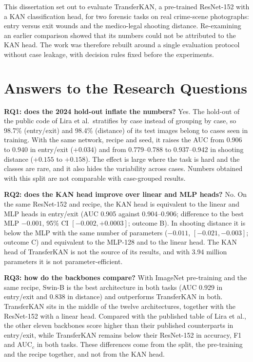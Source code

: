 \label{chap:conclusions}

This dissertation set out to evaluate TransferKAN, a pre-trained ResNet-152 with a KAN classification head, for two forensic tasks on real crime-scene photographs: entry versus exit wounds and the medico-legal shooting distance. Re-examining an earlier comparison showed that its numbers could not be attributed to the KAN head. The work was therefore rebuilt around a single evaluation protocol without case leakage, with decision rules fixed before the experiments.

\section{Answers to the Research Questions}
\label{sec:respostas}

\textbf{RQ1: does the 2024 hold-out inflate the numbers?} Yes. The hold-out of the public code of Lira et al.\ stratifies by case instead of grouping by case, so 98.7\% (entry/exit) and 98.4\% (distance) of its test images belong to cases seen in training. With the same network, recipe and seed, it raises the AUC from 0.906 to 0.940 in entry/exit ($+0.034$) and from 0.779--0.788 to 0.937--0.942 in shooting distance ($+0.155$ to $+0.158$). The effect is large where the task is hard and the classes are rare, and it also hides the variability across cases. Numbers obtained with this split are not comparable with case-grouped results.

\textbf{RQ2: does the KAN head improve over linear and MLP heads?} No. On the same ResNet-152 and recipe, the KAN head is equivalent to the linear and MLP heads in entry/exit (AUC 0.905 against 0.904--0.906; difference to the best MLP $-0.001$, 95\% CI $[-0.002, +0.0003]$; outcome B). In shooting distance it is below the MLP with the same number of parameters ($-0.011$, $[-0.021, -0.003]$; outcome C) and equivalent to the MLP-128 and to the linear head. The KAN head of TransferKAN is not the source of its results, and with 3.94 million parameters it is not parameter-efficient.

\textbf{RQ3: how do the backbones compare?} With ImageNet pre-training and the same recipe, Swin-B is the best architecture in both tasks (AUC 0.929 in entry/exit and 0.838 in distance) and outperforms TransferKAN in both. TransferKAN sits in the middle of the twelve architectures, together with the ResNet-152 with a linear head. Compared with the published table of Lira et al., the other eleven backbones score higher than their published counterparts in entry/exit, while TransferKAN remains below their ResNet-152 in accuracy, F1 and AUC$_c$ in both tasks. These differences come from the split, the pre-training and the recipe together, and not from the KAN head.

